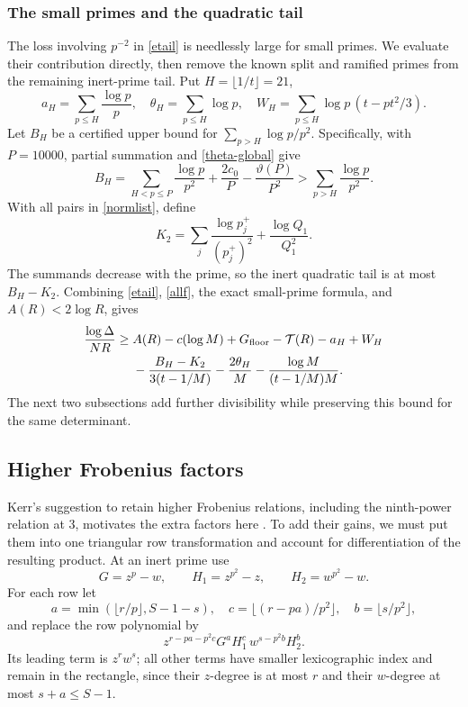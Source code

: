 \documentclass[11pt]{article}
\newcommand{\Tn}{\mathcal T}
\begin{document}
\subsubsection{The small primes and the quadratic tail}
The loss involving \(p^{-2}\) in \eqref{etail} is needlessly large
for small primes. We evaluate their contribution directly, then remove
the known split and ramified primes from the remaining inert-prime tail.
Put \(H=\lfloor1/t\rfloor=21\),
\[
 a_H=\sum_{p\le H}\frac{\log p}p,\quad
 \theta_H=\sum_{p\le H}\log p,\quad
 W_H=\sum_{p\le H}\log p\,(t-pt^2/3).
\]
Let \(B_H\) be a certified upper bound for
\(\sum_{p>H}\log p/p^2\). Specifically, with \(P=10000\),
partial summation and \eqref{theta-global} give
\[
 B_H=\sum_{H<p\le P}\frac{\log p}{p^2}
               +\frac{2c_0}{P}-\frac{\vartheta(P)}{P^2}
 >\sum_{p>H}\frac{\log p}{p^2}.
\]
With all pairs in \eqref{normlist}, define
\begin{equation}\label{Ktwo}
 K_2=\sum_j\frac{\log p_j^+}{(p_j^+)^2}
             +\frac{\log Q_1}{Q_1^2}.
\end{equation}
The summands decrease with the prime, so the inert quadratic tail
is at most \(B_H-K_2\). Combining \eqref{etail}, \eqref{allf}, the
exact small-prime formula, and \(A(R)<2\log R\), gives
\begin{align}\label{basevaluation}
 \frac{\log\Delta}{NR}\ge{}&
 A(R)-c(\log M)+G_{\rm floor}-\Tn(R)-a_H+W_H\\
 &-\frac{B_H-K_2}{3(t-1/M)}
 -\frac{2\theta_H}{M}-\frac{\log M}{(t-1/M)M}.
 \notag
\end{align}
The next two subsections add further divisibility while preserving this
bound for the same determinant.

\subsection{Higher Frobenius factors}\label{frobenius}
Kerr's suggestion to retain higher Frobenius relations, including the
ninth-power relation at 3, motivates the extra factors here
\cite{kerrcomment}. To add their gains, we must put them into one
triangular row transformation and account for differentiation of the
resulting product.
At an inert prime use
\[
 G=z^p-w,\qquad H_1=z^{p^2}-z,\qquad H_2=w^{p^2}-w.
\]
For each row let
\[
 a=\min(\lfloor r/p\rfloor,S-1-s),\quad
 c=\lfloor(r-pa)/p^2\rfloor,\quad b=\lfloor s/p^2\rfloor,
\]
and replace the row polynomial by
\begin{equation}\label{threefactor}
 z^{r-pa-p^2c}G^aH_1^c\,w^{s-p^2b}H_2^b.
\end{equation}
Its leading term is \(z^rw^s\); all other terms have smaller
lexicographic index and remain in the rectangle, since their
\(z\)-degree is at most \(r\) and their \(w\)-degree at most
\(s+a\le S-1\).
\end{document}
